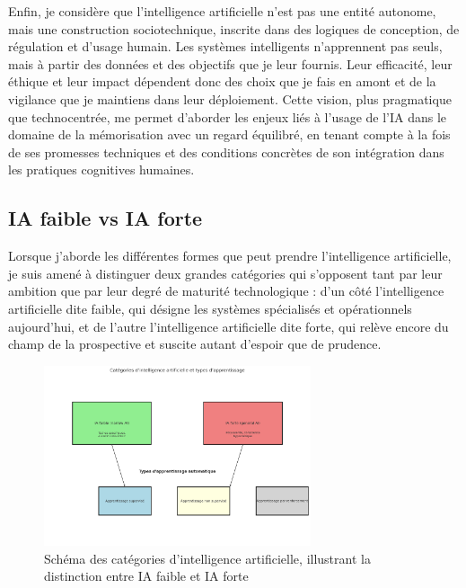 \documentclass[11pt,a4paper]{report}
\begin{document}
Enfin, je considère que l’intelligence artificielle n’est pas une entité autonome, mais une construction sociotechnique, inscrite dans des logiques de conception, de régulation et d’usage humain. Les systèmes intelligents n’apprennent pas seuls, mais à partir des données et des objectifs que je leur fournis. Leur efficacité, leur éthique et leur impact dépendent donc des choix que je fais en amont et de la vigilance que je maintiens dans leur déploiement. Cette vision, plus pragmatique que technocentrée, me permet d’aborder les enjeux liés à l’usage de l’IA dans le domaine de la mémorisation avec un regard équilibré, en tenant compte à la fois de ses promesses techniques et des conditions concrètes de son intégration dans les pratiques cognitives humaines.


\subsection{IA faible vs IA forte}

Lorsque j’aborde les différentes formes que peut prendre l’intelligence artificielle, je suis amené à distinguer deux grandes catégories qui s’opposent tant par leur ambition que par leur degré de maturité technologique : d’un côté l’intelligence artificielle dite faible, qui désigne les systèmes spécialisés et opérationnels aujourd’hui, et de l’autre l’intelligence artificielle dite forte, qui relève encore du champ de la prospective et suscite autant d’espoir que de prudence.

\begin{figure}[h]
    \centering
    \includegraphics[width=0.7\textwidth]{images/2.1.2.png}
    \caption{Schéma des catégories d’intelligence artificielle, illustrant la distinction entre IA faible et IA forte}
    \label{fig:2.1.2}
\end{figure}
\end{document}
